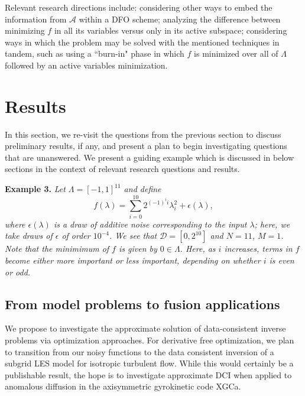 \documentclass{amsart}
\newcommand{\A}{\mathcal{A}}
\begin{document}
Relevant research directions include: considering other ways to embed the information from $\A$ within a DFO scheme; analyzing the difference between minimizing $f$ in all its variables versus only in its active subspace; considering ways in which the problem may be solved with the mentioned techniques in tandem, such as using a ``burn-in" phase in which $f$ is minimized over all of $\Lambda$ followed by an active variables minimization.



\section{Results}

In this section, we re-visit the questions from the previous section to discuss preliminary results, if any, and present a plan to begin investigating questions that are unanswered. We present a guiding example which is discussed in below sections in the context of relevant research questions and results.

\vspace{.125cm}

\noindent \textbf{Example 3.} \textit{Let $\Lambda=[-1,1]^{11}$ and define $$f(\lambda)=\sum_{i=0}^{10} 2^{(-1)^i i}\lambda_i^2+\epsilon(\lambda),$$ where $\epsilon(\lambda)$ is a draw of additive noise corresponding to the input $\lambda$; here, we take draws of $\epsilon$ of order $10^{-4}$. We see that $\mathcal{D}=[0,2^{10}]$ and $N=11$, $M=1$. Note that the minimimum of $f$ is given by $0 \in \Lambda$. Here, as $i$ increases, terms in $f$ become either more important or less important, depending on whether $i$ is even or odd.}






\subsection{From model problems to fusion applications}

We propose to investigate the approximate solution of data-consistent inverse problems via optimization approaches.  For derivative free optimization, we plan to transition from our noisy
functions to the data consistent inversion of a subgrid LES model for isotropic turbulent flow.  
While this would certainly be a publishable result, the hope is to investigate approximate DCI
when applied to anomalous diffusion in the axisymmetric gyrokinetic code XGCa.
\end{document}
